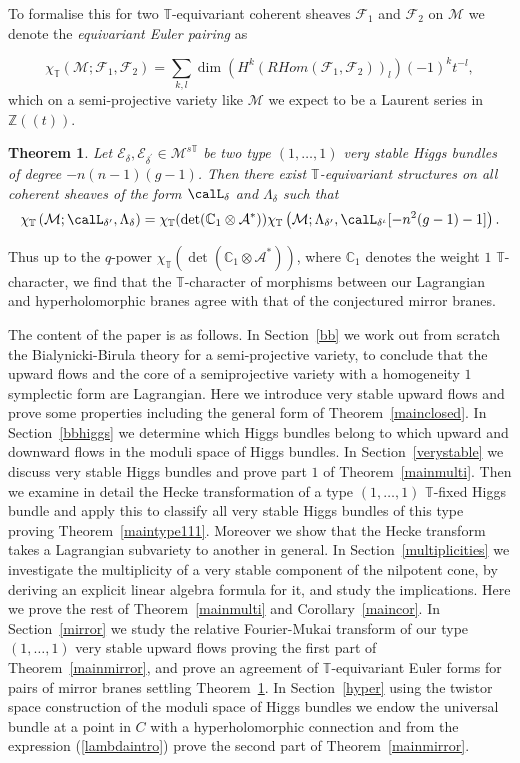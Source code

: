 \documentclass[12pt]{article}
\numberwithin{equation}{section}
\newtheorem{theorem}{Theorem}
\theoremstyle{remark}
\theoremstyle{definition}
\numberwithin{theorem}{section}
\def\calE{{\mathcal E}}
\def\C{\mathbb{C}}
\def\M{{\mathcal{M}}}
\def\calA{{\mathcal{A}}}
\def\calF{{\mathcal{F}}}
\newcommand{\T}{{\mathbb{T}}}
\def\Z{\mathbb{Z}}
\renewcommand{\1}{\mathbbm{1}}
\begin{document}
To formalise this for two $\T$-equivariant coherent sheaves $\calF_1$ and $\calF_2$ on $\M$  we denote the {\em equivariant Euler pairing} as

$$\chi_\T(\M;\calF_1,\calF_2)=\sum_{k,l} \dim(H^k({ R} {H\!om}(\calF_1,\calF_2))_l) (-1)^k t^{-l},$$ which
on a semi-projective variety like $\M$ we expect to be a Laurent series in $\Z((t))$. 

\begin{theorem} \label{maineuler}  Let $\calE_\delta,\calE_{\delta^\prime}\in \M^{s\T}$ be two type $(1,\dots,1)$ very stable Higgs bundles of degree $-n(n-1)(g-1)$. Then there exist $\T$-equivariant structures on all coherent  sheaves of the form $\calL_\delta$ and $\Lambda_\delta$  such that $$\chi_\T\left(\M;\calL_{\delta^\prime},\Lambda_{\delta}\right)=\chi_\T(\det(\C_{1}\otimes\calA^*)) \chi_\T\left(\M;\Lambda_{\delta^\prime},\calL_{\delta^\iota}[-n^2(g-1)-1]
	\right). $$
	
\end{theorem}

Thus up to the $q$-power $\chi_\T(\det(\C_{1}\otimes\calA^*))$, where $\C_1$ denotes the weight $1$ $\T$-character,  we find that the $\T$-character of morphisms between our Lagrangian and hyperholomorphic branes agree with that of the conjectured mirror branes. 

The content of  the paper is as follows. In Section~\ref{bb} we work out from scratch the Bialynicki-Birula theory for a semi-projective variety,  to conclude that the upward flows and the core of a semiprojective variety with a homogeneity $1$ symplectic form are Lagrangian. Here we  introduce very stable upward flows and prove some  properties including the general form of Theorem~\ref{mainclosed}.  In Section~\ref{bbhiggs} we determine which Higgs bundles belong to which upward and downward flows in the moduli space of Higgs bundles. In Section~\ref{verystable} we discuss very stable Higgs bundles and prove part $1$ of Theorem~\ref{mainmulti}. Then we examine in detail the Hecke transformation  of a  type $(1,\dots,1)$ $\T$-fixed Higgs bundle and apply this to classify all very stable Higgs bundles of this type proving Theorem~\ref{maintype111}. Moreover we show that the Hecke transform takes a Lagrangian subvariety to another in general. In Section~\ref{multiplicities} we investigate the multiplicity of a very stable component of the nilpotent cone, by deriving an explicit linear algebra formula for it, and study the implications. Here we prove the rest of Theorem~\ref{mainmulti} and Corollary~\ref{maincor}.  In Section~\ref{mirror} we study the relative Fourier-Mukai transform of our type $(1,\dots,1)$ very stable upward flows proving the first part of  Theorem~\ref{mainmirror}, and prove an agreement of $\T$-equivariant Euler forms for pairs of mirror branes settling Theorem~\ref{maineuler}. In Section~\ref{hyper} using the twistor space construction of the moduli space of Higgs bundles we endow the universal bundle at a point in $C$ with a hyperholomorphic connection and from the expression (\ref{lambdaintro}) prove  the second part of Theorem~\ref{mainmirror}. 
\end{document}
